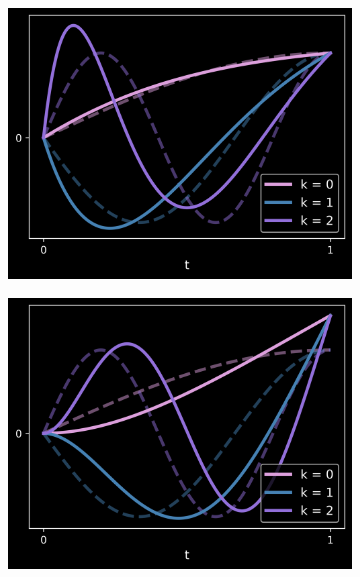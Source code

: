 \begin{figure}[t]
\begin{subfigure}[b]{0.32\textwidth}
    \centering
    \includegraphics[scale =0.385]{KL/Figures/KLAsian.png}
\end{subfigure}
\begin{subfigure}[b]{0.32\textwidth}
    \centering
    \includegraphics[scale =0.385]{KL/Figures/KLIntegral.png}
\end{subfigure}
\begin{subfigure}[b]{0.32\textwidth}
    \centering

\end{subfigure}
\end{figure}
